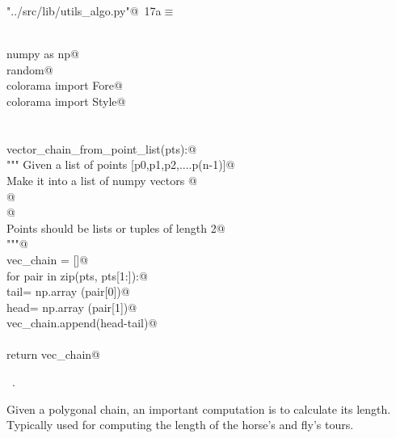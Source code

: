 \documentclass[11.5pt]{report}
\begin{document}
\begin{flushleft} \small\label{scrap6}\raggedright\small
{} \verb@"../src/lib/utils_algo.py"@\nobreak\ {\footnotesize {17a}}$\equiv$
\vspace{-1ex}
\begin{list}{}{} \item
\mbox{}\verb@@\\
\mbox{}\verb@import numpy as np@\\
\mbox{}\verb@import random@\\
\mbox{}\verb@from colorama import Fore@\\
\mbox{}\verb@from colorama import Style@\\
\mbox{}\verb@@\\
\mbox{}\verb@@\\
\mbox{}\verb@def vector_chain_from_point_list(pts):@\\
\mbox{}\verb@    """ Given a list of points [p0,p1,p2,....p(n-1)]@\\
\mbox{}\verb@    Make it into a list of numpy vectors @\\
\mbox{}\verb@    [p1-p0, p2-p1,...,p(n-1)-p(n-2)]@\\
\mbox{}\verb@    @\\
\mbox{}\verb@    Points should be lists or tuples of length 2@\\
\mbox{}\verb@    """@\\
\mbox{}\verb@    vec_chain = []@\\
\mbox{}\verb@    for pair in zip(pts, pts[1:]):@\\
\mbox{}\verb@        tail= np.array (pair[0])@\\
\mbox{}\verb@        head= np.array (pair[1])@\\
\mbox{}\verb@        vec_chain.append(head-tail)@\\
\mbox{}\verb@@\\
\mbox{}\verb@    return vec_chain@\\
\mbox{}\verb@@{\NWsep}
\end{list}
\vspace{-1.5ex}
\footnotesize
\begin{list}{}{\setlength{\itemsep}{-\parsep}\setlength{\itemindent}{-\leftmargin}}
\item \NWtxtFileDefBy\ .

\item{}
\end{list}
\vspace{4ex}
\end{flushleft}
\newchunk Given a polygonal chain, an important computation is to calculate 
its length. Typically used for computing the length of the horse's and fly's tours. 
\end{document}
